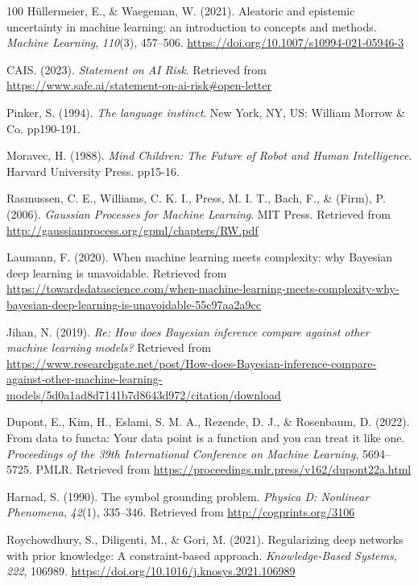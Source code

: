 \documentclass[11pt]{book}
\begin{document}
\begin{thebibliography}{100}
 Hüllermeier, E., \& Waegeman, W. (2021). Aleatoric and epistemic
uncertainty in machine learning: an introduction to concepts and
methods. \emph{Machine Learning}, \emph{110}(3), 457--506.
\url{https://doi.org/10.1007/s10994-021-05946-3}

 CAIS. (2023). \emph{Statement on AI Risk}. Retrieved from
\url{https://www.safe.ai/statement-on-ai-risk\#open-letter}

 Pinker, S. (1994). \emph{The language instinct}. New York, NY, US:
William Morrow \& Co. pp190-191.

 Moravec, H. (1988). \emph{Mind Children: The Future of Robot and Human
Intelligence}. Harvard University Press. pp15-16.

 Rasmussen, C. E., Williams, C. K. I., Press, M. I. T., Bach, F., \&
(Firm), P. (2006). \emph{Gaussian Processes for Machine Learning}. MIT
Press. Retrieved from
\url{http://gaussianprocess.org/gpml/chapters/RW.pdf}

 Laumann, F. (2020). When machine learning meets complexity: why Bayesian
deep learning is unavoidable. Retrieved from
\url{https://towardsdatascience.com/when-machine-learning-meets-complexity-why-bayesian-deep-learning-is-unavoidable-55c97aa2a9cc}

 Jihan, N. (2019). \emph{Re: How does Bayesian inference compare against
other machine learning models?} Retrieved from
\url{https://www.researchgate.net/post/How-does-Bayesian-inference-compare-against-other-machine-learning-models/5d0a1ad8d7141b7d8643d972/citation/download}

 Dupont, E., Kim, H., Eslami, S. M. A., Rezende, D. J., \& Rosenbaum, D.
(2022). From data to functa: Your data point is a function and you can
treat it like one. \emph{Proceedings of the 39th International
Conference on Machine Learning}, 5694--5725. PMLR. Retrieved from
\url{https://proceedings.mlr.press/v162/dupont22a.html}

 Harnad, S. (1990). The symbol grounding problem. \emph{Physica D:
Nonlinear Phenomena}, \emph{42}(1), 335--346. Retrieved from
\url{http://cogprints.org/3106}

 Roychowdhury, S., Diligenti, M., \& Gori, M. (2021). Regularizing deep
networks with prior knowledge: A constraint-based approach.
\emph{Knowledge-Based Systems}, \emph{222}, 106989.
\url{https://doi.org/10.1016/j.knosys.2021.106989}


\end{thebibliography}
\end{document}
